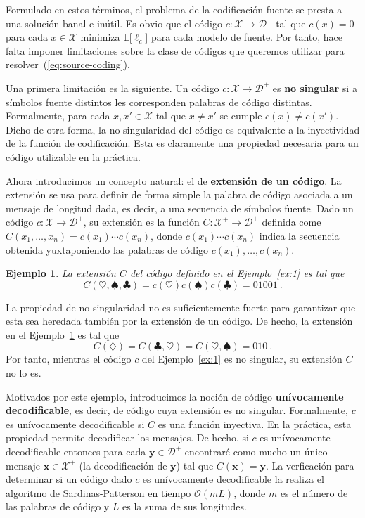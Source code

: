 \documentclass[11pt]{article}
\newtheorem{example}[theorem]{Ejemplo}
\newcommand{\bx}{ \boldsymbol{x} }
\newcommand{\by}{ \boldsymbol{y} }
\newcommand{\scD}{\mathcal{D}}
\newcommand{\scX}{\mathcal{X}}
\newcommand{\field}[1]{\mathbb{#1}}
\newcommand{\E}{\field{E}}
\begin{document}
Formulado en estos términos, el problema de la codificación fuente se presta a una solución banal e inútil. Es obvio que el código $c : \scX\to\scD^+$ tal que $c(x)=0$ para cada $x\in\scX$ minimiza $\E\bigl[\ell_c\bigr]$ para cada modelo de fuente. Por tanto, hace falta imponer limitaciones sobre la clase de códigos que queremos utilizar para resolver~(\ref{eq:source-coding}).

Una primera limitación es la siguiente. Un código $c : \scX\to\scD^+$ es \textbf{no singular} si a símbolos fuente distintos les corresponden palabras de código distintas. Formalmente, para cada $x,x'\in\scX$ tal que $x \neq x'$ se cumple $c(x) \neq c(x')$. Dicho de otra forma, la no singularidad del código es equivalente a la inyectividad de la función de codificación. Esta es claramente una propiedad necesaria para un código utilizable en la práctica.

Ahora introducimos un concepto natural: el de \textbf{extensión de un código}. La extensión se usa para definir de forma simple la palabra de código asociada a un mensaje de longitud dada, es decir, a una secuencia de símbolos fuente. Dado un código $c : \scX\to\scD^+$, su extensión es la función $C : \scX^+\to\scD^+$ definida come
$
    C(x_1,\dots,x_n) = c(x_1) \cdots c(x_n)
$, donde $c(x_1) \cdots c(x_n)$ indica la secuencia obtenida yuxtaponiendo las palabras de código $c(x_1),\dots,c(x_n)$.
%
\begin{example}
\label{ex:2}
La extensión $C$ del código definido en el Ejemplo~\ref{ex:1} es tal que
\[
    C(\heartsuit,\spadesuit,\clubsuit) = c(\heartsuit)c(\spadesuit)c(\clubsuit) = 01001~.
\]
\end{example}
%
La propiedad de no singularidad no es suficientemente fuerte para garantizar que esta sea heredada también por la extensión de un código. De hecho, la extensión en el Ejemplo~\ref{ex:2} es tal que
\[
    C(\diamondsuit) = C(\clubsuit,\heartsuit) = C(\heartsuit,\spadesuit) = 010~.
\]
Por tanto, mientras el código $c$ del Ejemplo~\ref{ex:1} es no singular, su extensión $C$ no lo es.

Motivados por este ejemplo, introducimos la noción de código \textbf{unívocamente decodificable}, es decir, de código cuya extensión es no singular. Formalmente, $c$ es unívocamente decodificable si $C$ es una función inyectiva. En la práctica, esta propiedad permite decodificar los mensajes. De hecho, si $c$ es unívocamente decodificable entonces para cada $\by\in\scD^+$ encontraré como mucho un único mensaje $\bx\in\scX^+$ (la decodificación de $\by$) tal que $C(\bx) = \by$. La verficación para determinar si un código dado $c$ es unívocamente decodificable la realiza el algoritmo de Sardinas-Patterson en tiempo $\mathcal{O}(mL)$, donde $m$ es el número de las palabras de código y $L$ es la suma de sus longitudes.
\end{document}
